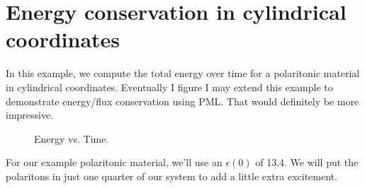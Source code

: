 \begin{comment}
#include <stdio.h>
#include <stdlib.h>
#include <signal.h>
\end{comment}

\section{Energy conservation in cylindrical coordinates}

In this example, we compute the total energy over time for a polaritonic
material in cylindrical coordinates.  Eventually I figure I may extend this
example to demonstrate energy/flux conservation using PML.  That would
definitely be more impressive.

\begin{figure}
\label{econs_1d}
\caption{Energy vs. Time.}
\end{figure}

\begin{comment}
#include "meep.h"

const double a = 10;
\end{comment}

For our example polaritonic material, we'll use an $\epsilon(0)$ of 13.4.
We will put the polaritons in just one quarter of our system to add a
little extra excitement.


